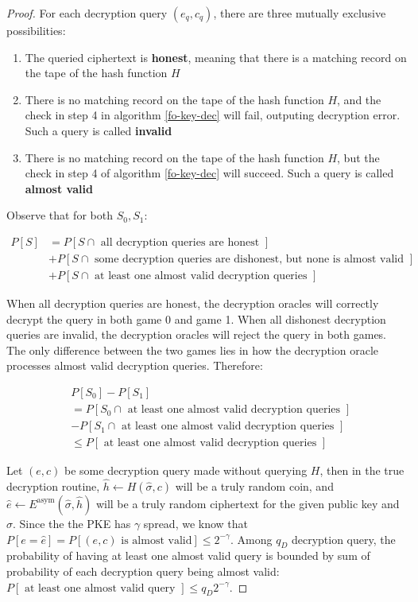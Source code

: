 \documentclass{article}
\begin{document}
\begin{proof}
    For each decryption query $(e_q, c_q)$, there are three mutually exclusive possibilities:

    \begin{enumerate}
        \item The queried ciphertext is \textbf{honest}, meaning that there is a matching record on the tape of the hash function $H$
        \item There is no matching record on the tape of the hash function $H$, and the check in step 4 in algorithm \ref{fo-key-dec} will fail, outputing decryption error. Such a query is called \textbf{invalid}
        \item There is no matching record on the tape of the hash function $H$, but the check in step 4 of algorithm \ref{fo-key-dec} will succeed. Such a query is called \textbf{almost valid}
    \end{enumerate}

    Observe that for both $S_0, S_1$:

    $$
    \begin{aligned}
        P[S] &= P[S \cap \text{ all decryption queries are honest }] \\
        &+ P[S \cap \text{ some decryption queries are dishonest, but none is almost valid }] \\
        &+ P[S \cap \text{ at least one almost valid decryption queries }]
    \end{aligned}
    $$

    When all decryption queries are honest, the decryption oracles will correctly decrypt the query in both game 0 and game 1. When all dishonest decryption queries are invalid, the decryption oracles will reject the query in both games. The only difference between the two games lies in how the decryption oracle processes almost valid decryption queries. Therefore:

    $$
    \begin{aligned}
        &P[S_0] - P[S_1] \\
        &= P[S_0 \cap \text{ at least one almost valid decryption queries }] \\
        &- P[S_1 \cap \text{ at least one almost valid decryption queries }] \\
        &\leq P[\text{ at least one almost valid decryption queries }]
    \end{aligned}
    $$

    Let $(e, c)$ be some decryption query made without querying $H$, then in the true decryption routine, $\hat{h} \leftarrow H(\hat{\sigma}, c)$ will be a truly random coin, and $\hat{e} \leftarrow E^\text{asym}(\hat{\sigma}, \hat{h})$ will be a truly random ciphertext for the given public key and $\hat{\sigma}$. Since the the PKE has $\gamma$ spread, we know that $P[e = \hat{e}] = P[(e, c) \text{ is almost valid}] \leq 2^{-\gamma}$. Among $q_D$ decryption query, the probability of having at least one almost valid query is bounded by sum of probability of each decryption query being almost valid: $P[\text{ at least one almost valid query }] \leq q_D 2^{-\gamma}$.
\end{proof}
\end{document}
